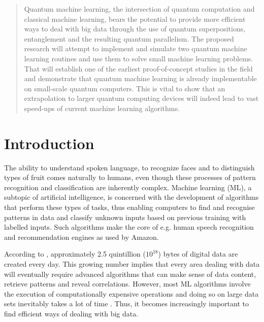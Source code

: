 \documentclass[a4paper]{article}
\newcommand*{\0}{$\ket{0}$}
\newcommand*{\1}{$\ket{1}$}
\begin{document}
\vspace{10.0cm}
\begin{abstract}
\noindent Quantum machine learning, the intersection of quantum computation and classical machine learning, bears the potential to provide more efficient ways to deal with big data through the use of quantum superpositions, entanglement and the resulting quantum parallelism. The proposed research will attempt to implement and simulate two quantum machine learning routines and use them to solve small machine learning problems. That will establish one of the earliest proof-of-concept studies in the field and demonstrate that quantum machine learning is already implementable on small-scale quantum computers. This is vital to show that an extrapolation to larger quantum computing devices will indeed lead to vast speed-ups of current machine learning algorithms.


\end{abstract}
	\newpage
	\tableofcontents
	\newpage

\section{Introduction}
\label{sec:introduction}


The ability to understand spoken language, to recognize faces and to distinguish types of fruit comes naturally to humans, even though these processes of pattern recognition and classification are inherently complex. Machine learning (ML), a subtopic of artificial intelligence, is concerned with the development of algorithms that perform these types of tasks, thus enabling computers to find and recognise patterns in data and classify unknown inputs based on previous training with labelled inputs. Such algorithms make the core of e.g. human speech recognition and recommendation engines as used by Amazon.

According to \cite*{bigdata}, approximately 2.5 quintillion (${10}^{18}$) bytes of digital data are created every day. This growing number implies that every area dealing with data will eventually require advanced algorithms that can make sense of data content, retrieve patterns and reveal correlations. However, most ML algorithms involve the execution of computationally expensive operations and doing so on large data sets inevitably takes a lot of time \citep{bekkerman2011scaling}. Thus, it becomes increasingly important to find efficient ways of dealing with big data.
\end{document}
